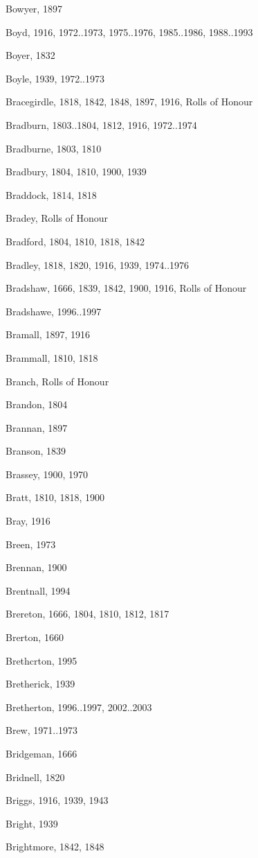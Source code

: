 {\begin{theindex}
\item Bowyer, 1897
\item Boyd, 1916, 1972..1973, 1975..1976, 1985..1986, 1988..1993
\item Boyer, 1832
\item Boyle, 1939, 1972..1973
\item Bracegirdle, 1818, 1842, 1848, 1897, 1916, Rolls of Honour
\item Bradburn, 1803..1804, 1812, 1916, 1972..1974
\item Bradburne, 1803, 1810
\item Bradbury, 1804, 1810, 1900, 1939
\item Braddock, 1814, 1818
\item Bradey, Rolls of Honour
\item Bradford, 1804, 1810, 1818, 1842
\item Bradley, 1818, 1820, 1916, 1939, 1974..1976
\item Bradshaw, 1666, 1839, 1842, 1900, 1916, Rolls of Honour
\item Bradshawe, 1996..1997
\item Bramall, 1897, 1916
\item Brammall, 1810, 1818
\item Branch, Rolls of Honour
\item Brandon, 1804
\item Brannan, 1897
\item Branson, 1839
\item Brassey, 1900, 1970
\item Bratt, 1810, 1818, 1900
\item Bray, 1916
\item Breen, 1973
\item Brennan, 1900
\item Brentnall, 1994
\item Brereton, 1666, 1804, 1810, 1812, 1817
\item Brerton, 1660
\item Brethcrton, 1995
\item Bretherick, 1939
\item Bretherton, 1996..1997, 2002..2003
\item Brew, 1971..1973
\item Bridgeman, 1666
\item Bridnell, 1820
\item Briggs, 1916, 1939, 1943
\item Bright, 1939
\item Brightmore, 1842, 1848

\end{theindex}}
